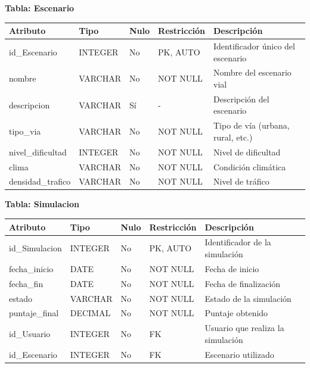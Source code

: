 \documentclass[12pt]{article}
\begin{document}
\textbf{Tabla: Escenario}
\begin{table}[H]
\centering
\begin{tabular}{|p{3cm}|p{2cm}|p{1cm}|p{2cm}|p{5cm}|}
\hline
\textbf{Atributo} & \textbf{Tipo} & \textbf{Nulo} & \textbf{Restricción} & \textbf{Descripción} \\ \hline
id\_Escenario & INTEGER & No & PK, AUTO & Identificador único del escenario \\ \hline
nombre & VARCHAR & No & NOT NULL & Nombre del escenario vial \\ \hline
descripcion & VARCHAR & Sí & - & Descripción del escenario \\ \hline
tipo\_via & VARCHAR & No & NOT NULL & Tipo de vía (urbana, rural, etc.) \\ \hline
nivel\_dificultad & INTEGER & No & NOT NULL & Nivel de dificultad \\ \hline
clima & VARCHAR & No & NOT NULL & Condición climática \\ \hline
densidad\_trafico & VARCHAR & No & NOT NULL & Nivel de tráfico \\ \hline
\end{tabular}
\end{table}

\textbf{Tabla: Simulacion}
\begin{table}[H]
\centering
\begin{tabular}{|p{3cm}|p{2cm}|p{1cm}|p{2cm}|p{5cm}|}
\hline
\textbf{Atributo} & \textbf{Tipo} & \textbf{Nulo} & \textbf{Restricción} & \textbf{Descripción} \\ \hline
id\_Simulacion & INTEGER & No & PK, AUTO & Identificador de la simulación \\ \hline
fecha\_inicio & DATE & No & NOT NULL & Fecha de inicio \\ \hline
fecha\_fin & DATE & No & NOT NULL & Fecha de finalización \\ \hline
estado & VARCHAR & No & NOT NULL & Estado de la simulación \\ \hline
puntaje\_final & DECIMAL & No & NOT NULL & Puntaje obtenido \\ \hline
id\_Usuario & INTEGER & No & FK & Usuario que realiza la simulación \\ \hline
id\_Escenario & INTEGER & No & FK & Escenario utilizado \\ \hline
\end{tabular}
\end{table}
\end{document}
